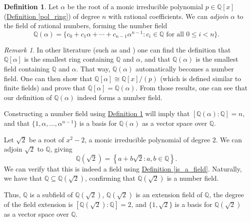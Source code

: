 \documentclass[openany, a4paper, 10pt]{book}
\theoremstyle{plain}
\theoremstyle{plain}
\theoremstyle{plain}
\theoremstyle{definition}
\newtheorem{definition}[theorem]{Definition}
\theoremstyle{plain}
\theoremstyle{definition}
\theoremstyle{remark}
\newtheorem*{remark}{Remark}
\newcommand{\defref}[1]{\hyperref[#1]{Definition \ref{#1}}}
\begin{document}
\begin{definition}\label{adjoin}
    Let $\alpha$ be the root of a monic irreducible polynomial $p \in \mathbb Q[x]$ (\defref{pol_ring}) of degree $n$ with rational coefficients.
    We can \textit{adjoin} $\alpha$ to the field of rational numbers, forming the number field
    \begin{equation*}
        \mathbb Q(\alpha) = \{ c_0+c_1\alpha+\cdots + c_{n-1}\alpha^{n-1}: c_i \in \mathbb Q \text{ for all } 0 \leq i < n \}.
    \end{equation*}
\end{definition}
\begin{remark}
    In other literature (such as \cite{algebraic_1} and \cite{algebraic_2}) one can find the definition that $\mathbb Q[\alpha]$ is the smallest ring containing $\mathbb Q$ and $\alpha$, and that $\mathbb Q(\alpha)$ is the smallest field containing $\mathbb Q$ and $\alpha$.
    That way, $\mathbb Q(\alpha)$ automatically becomes a number field.
    One can then show that $\mathbb Q[\alpha] \cong \mathbb Q[x] / (p)$ (which is defined similar to finite fields) and prove that $\mathbb Q[\alpha] = \mathbb Q(\alpha)$.
    From those results, one can see that our definition of $\mathbb Q(\alpha)$ indeed forms a number field.
\end{remark}

Constructing a number field using \defref{adjoin} will imply that $[\mathbb Q(\alpha): \mathbb Q] = n$, and that $\{ 1, \alpha, \dots, \alpha^{n-1}\}$ is a basis for $\mathbb Q(\alpha)$ as a vector space over $\mathbb Q$.

\begin{examplebox}
    Let $\sqrt{2}$ be a root of $x^2-2$, a monic irreducible polynomial of degree $2$.
    We can adjoin $\sqrt{2}$ to $\mathbb Q$, giving
    \begin{equation*}
        \mathbb Q(\sqrt{2}) = \left\{ a+b\sqrt{2}: a,b \in \mathbb Q \right\}.
    \end{equation*}
    We can verify that this is indeed a field using \defref{is_a_field}.
    Naturally, we have that $\mathbb Q \subseteq \mathbb Q(\sqrt{2})$, confirming that $\mathbb Q(\sqrt{2})$ is a number field.

    Thus, $\mathbb Q$ is a subfield of $\mathbb Q(\sqrt{2})$, $\mathbb Q(\sqrt{2})$ is an extension field of $\mathbb Q$, the degree of the field extension is $[\mathbb Q(\sqrt{2}): \mathbb Q]=2$, and $\{1, \sqrt{2} \}$ is a basis for $\mathbb Q(\sqrt{2})$ as a vector space over $\mathbb Q$.
\end{examplebox}
\end{document}
